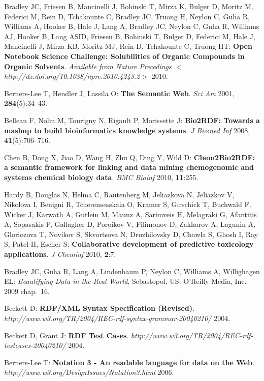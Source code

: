 \documentclass[10pt]{bmc_article}
\newenvironment{bmcformat}{\begin{raggedright}\baselineskip20pt\sloppy\setboolean{publ}{false}}{\end{raggedright}\baselineskip20pt\sloppy}
\begin{document}
\begin{bmcformat}
\begin{thebibliography}{10}
Bradley JC, Friesen B, Mancinelli J, Bohinski T, Mirza K, Bulger D, Moritz M,
  Federici M, Rein D, Tchakounte C, Bradley JC, Truong H, Neylon C, Guha R,
  Williams A, Hooker B, Hale J, Lang A, Bradley JC, Neylon C, Guha R, Williams
  AJ, Hooker B, Lang ASID, Friesen B, Bohinski T, Bulger D, Federici M, Hale J,
  Mancinelli J, Mirza KB, Moritz MJ, Rein D, Tchakounte C, Truong HT:
  \textbf{Open Notebook Science Challenge: Solubilities of Organic Compounds in
  Organic Solvents}. \emph{Available from Nature Precedings
  $<$http://dx.doi.org/10.1038/npre.2010.4243.2$>$} 2010.

Berners-Lee T, Hendler J, Lassila O: \textbf{The Semantic Web}. \emph{Sci Am}
  2001, \textbf{284}(5):34--43.

Belleau F, Nolin M, Tourigny N, Rigault P, Morissette J: \textbf{{Bio2RDF}:
  Towards a mashup to build bioinformatics knowledge systems}. \emph{J Biomed
  Inf} 2008, \textbf{41}(5):706--716.

Chen B, Dong X, Jiao D, Wang H, Zhu Q, Ding Y, Wild D: \textbf{{Chem2Bio2RDF}:
  a semantic framework for linking and data mining chemogenomic and systems
  chemical biology data}. \emph{BMC Bioinf} 2010, \textbf{11}:255.

Hardy B, Douglas N, Helma C, Rautenberg M, Jeliazkova N, Jeliazkov V, Nikolova
  I, Benigni R, Tcheremenskaia O, Kramer S, Girschick T, Buchwald F, Wicker J,
  Karwath A, Gutlein M, Maunz A, Sarimveis H, Melagraki G, Afantitis A,
  Sopasakis P, Gallagher D, Poroikov V, Filimonov D, Zakharov A, Lagunin A,
  Gloriozova T, Novikov S, Skvortsova N, Druzhilovsky D, Chawla S, Ghosh I, Ray
  S, Patel H, Escher S: \textbf{Collaborative development of predictive
  toxicology applications}. \emph{J Cheminf} 2010, \textbf{2}:7.

Bradley JC, Guha R, Lang A, Lindenbaum P, Neylon C, Williams A, Willighagen EL:
  \emph{Beautifying Data in the Real World}, Sebastopol, US: O'Reilly Media,
  Inc. 2009 chap.~16.

Beckett D: \textbf{{RDF}/XML Syntax Specification (Revised)}.
  \emph{http://www.w3.org/TR/2004/REC-rdf-syntax-grammar-20040210/} 2004.

Beckett D, Grant J: \textbf{{RDF} Test Cases}.
  \emph{http://www.w3.org/TR/2004/REC-rdf-testcases-20040210/} 2004.

Berners-Lee T: \textbf{Notation 3 - An readable language for data on the Web}.
  \emph{http://www.w3.org/DesignIssues/Notation3.html} 2006.


\end{thebibliography}
\end{bmcformat}
\end{document}
